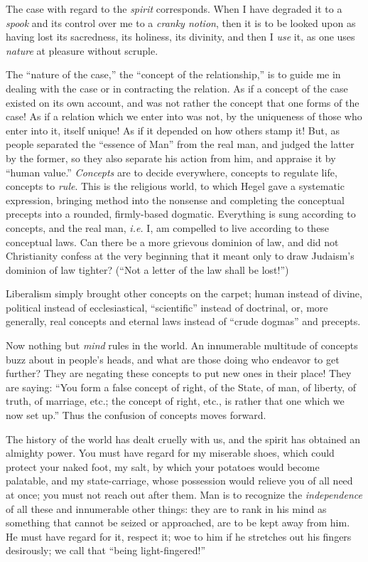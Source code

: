 The case with regard to the \textit{spirit} corresponds. When I have degraded 
it to a \textit{spook} and its control over me to a \textit{cranky notion}, 
then it is to be looked upon as having lost its sacredness, its holiness, its 
divinity, and then I \textit{use} it, as one uses \textit{nature} at pleasure 
without scruple.

The ``nature of the case,'' the ``concept of the relationship,'' is to 
guide me in dealing with the case or in contracting the relation. As if a 
concept of the case existed on its own account, and was not rather the concept 
that one forms of the case! As if a relation which we enter into was not, by 
the uniqueness of those who enter into it, itself unique! As if it depended on 
how others stamp it! But, as people separated the ``essence of Man'' from 
the real man, and judged the latter by the former, so they also separate his 
action from him, and appraise it by ``human value.'' \textit{Concepts} are 
to decide everywhere, concepts to regulate life, concepts to \textit{rule}. 
This is the religious world, to which Hegel gave a systematic expression, 
bringing method into the nonsense and completing the conceptual precepts into 
a rounded, firmly-based dogmatic. Everything is sung according to concepts, 
and the real man, \textit{i.e.} I, am compelled to live according to these 
conceptual laws. Can there be a more grievous dominion of law, and did not 
Christianity confess at the very beginning that it meant only to draw 
Judaism's dominion of law tighter? (``Not a letter of the law shall be 
lost!'')

Liberalism simply brought other concepts on the carpet; human instead of 
divine, political instead of ecclesiastical, ``scientific'' instead of 
doctrinal, or, more generally, real concepts and eternal laws instead of 
``crude dogmas'' and precepts.

Now nothing but \textit{mind} rules in the world. An innumerable multitude of 
concepts buzz about in people's heads, and what are those doing who endeavor 
to get further? They are negating these concepts to put new ones in their 
place! They are saying: ``You form a false concept of right, of the State, of 
man, of liberty, of truth, of marriage, etc.; the concept of right, etc., is 
rather that one which we now set up.'' Thus the confusion of concepts moves 
forward.

The history of the world has dealt cruelly with us, and the spirit has 
obtained an almighty power. You must have regard for my miserable shoes, which 
could protect your naked foot, my salt, by which your potatoes would become 
palatable, and my state-carriage, whose possession would relieve you of all 
need at once; you must not reach out after them. Man is to recognize the 
\textit{independence} of all these and innumerable other things: they are to 
rank in his mind as something that cannot be seized or approached, are to be 
kept away from him. He must have regard for it, respect it; woe to him if he 
stretches out his fingers desirously; we call that ``being light-fingered!''

